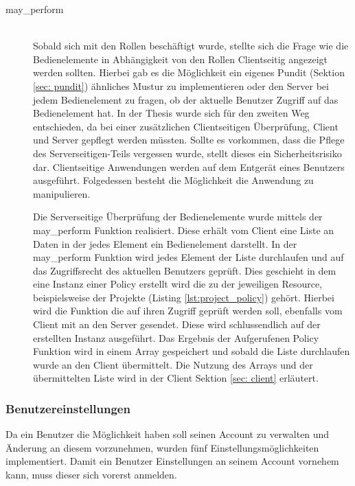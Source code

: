 \documentclass[paper=a4,fontsize=12pt,parskip=half]{scrartcl}
\begin{document}
	\begin{description}
		\item[may\_perform]\hfill\\
		Sobald sich mit den Rollen beschäftigt wurde, stellte sich die Frage wie die Bedienelemente in Abhängigkeit von den Rollen Clientseitig angezeigt werden sollten. Hierbei gab es die Möglichkeit ein eigenes Pundit (Sektion \ref{sec: pundit}) ähnliches Mustur zu implementieren oder den Server bei jedem Bedienelement zu fragen, ob der aktuelle Benutzer Zugriff auf das Bedienelement hat. In der Thesis wurde sich für den zweiten Weg entschieden, da bei einer zusätzlichen Clientseitigen Überprüfung, Client und Server gepflegt werden müssten. Sollte es vorkommen, dass die Pflege des Serverseitigen-Teils vergessen wurde, stellt dieses ein Sicherheitsrisiko dar. Clientseitige Anwendungen werden auf dem Entgerät eines Benutzers ausgeführt. Folgedessen besteht die Möglichkeit die Anwendung zu manipulieren.

		Die Serverseitige Überprüfung der Bedienelemente wurde mittels der may\_perform Funktion realisiert. Diese erhält vom Client eine Liste an Daten in der jedes Element ein Bedienelement darstellt. In der may\_perform Funktion wird jedes Element der Liste durchlaufen und auf das Zugriffsrecht des aktuellen Benutzers geprüft. Dies geschieht in dem eine Instanz einer Policy erstellt wird die zu der jeweiligen Resource, beispielsweise der Projekte (Listing \ref{lst:project_policy}) gehört. Hierbei wird die Funktion die auf ihren Zugriff geprüft werden soll, ebenfalls vom Client mit an den Server gesendet. Diese wird schlussendlich auf der erstellten Instanz ausgeführt. Das Ergebnis der Aufgerufenen Policy Funktion wird in einem Array gespeichert und sobald die Liste durchlaufen wurde an den Client übermittelt. Die Nutzung des Arrays und der übermittelten Liste wird in der Client Sektion \ref{sec: client} erläutert.
	\end{description}

	\subsubsection{Benutzereinstellungen}
	Da ein Benutzer die Möglichkeit haben soll seinen Account zu verwalten und Änderung an diesem vorzunehmen, wurden fünf Einstellungsmöglichkeiten implementiert. Damit ein Benutzer Einstellungen an seinem Account vornehem kann, muss dieser sich vorerst anmelden.
\end{document}
